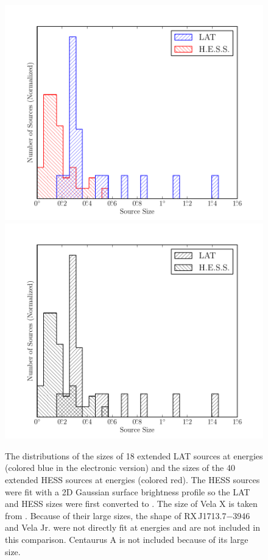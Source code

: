 \begin{figure}[htbp]
    \ifcolorfigure
      \includegraphics{chapters/extended_search/figures/summary_plots/gev_vs_tev_histogram_color.pdf}
    \else
      \includegraphics{chapters/extended_search/figures/summary_plots/gev_vs_tev_histogram_bw.pdf}
    \fi
    \caption{
    The distributions of the sizes of 18 extended LAT sources
    at \gev energies
    (colored blue in the electronic version) and the sizes of the
    40 extended \ac{HESS} sources at \tev energies
    (colored red).  
    The \ac{HESS} sources were fit with a 2D Gaussian surface
    brightness profile so the LAT and \ac{HESS} sizes were first converted
    to \rsixeight. 
    The \gev size of Vela X is taken from \cite{abdo_2010c_fermi-large}.  
    Because of their large sizes, the shape of RX\,J1713.7$-$3946 and
    Vela Jr. were not directly fit at \tev energies
    and are not included in this comparison.
    Centaurus A is not included because of its large size.
    }
  \end{figure}

